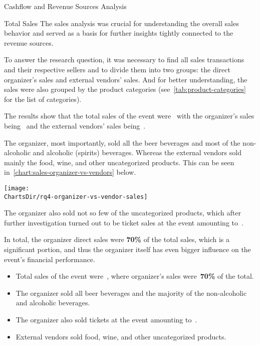 \begin{section}{Cashflow and Revenue Sources Analysis}
\begin{subsection}{Total Sales}
		The sales analysis was crucial for understanding the overall sales behavior and served as a basis for further insights tightly connected to the revenue sources.

		To answer the research question, it was necessary to find all sales transactions and their respective sellers and to divide them into two groups: the direct organizer's sales and external vendors' sales.
		And for better understanding, the sales were also grouped by the product categories (see~\autoref{tab:product-categories} for the list of categories).

		The results show that the total sales of the event were~ with the organizer's sales being~ and the external vendors' sales being~.

		The organizer, most importantly, sold all the beer beverages and most of the non-alcoholic and alcoholic (spirits) beverages.
		Whereas the external vendors sold mainly the food, wine, and other uncategorized products.
		This can be seen in~\autoref{chart:sales-organizer-vs-vendors} below.

		\begin{chart}[h]
			\centering
			\texttt{[image: \\ChartsDir/rq4-organizer-vs-vendor-sales]}
			\caption{ Sales of the Organizer vs. External Vendors}
			\label{chart:sales-organizer-vs-vendors}
			\source
		\end{chart}

		\pagebreak[4]

		The organizer also sold not so few of the uncategorized products, which after further investigation turned out to be ticket sales at the event amounting to~.

		In total, the organizer direct sales were \textbf{70\%} of the total sales, which is a significant portion, and thus the organizer itself has even bigger influence on the event's financial performance.

		\begin{keytakeaways}
			\begin{itemize}
				\item Total sales of the event were~, where organizer's sales were~\textbf{70\%} of the total.
				\item The organizer sold all beer beverages and the majority of the non-alcoholic and alcoholic beverages.
				\item The organizer also sold tickets at the event amounting to~.
				\item External vendors sold food, wine, and other uncategorized products.
			\end{itemize}
		\end{keytakeaways}
	\end{subsection}



\end{section}
